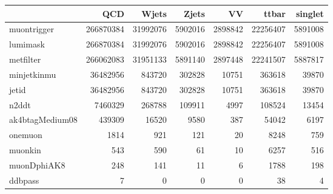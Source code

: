 \begin{tabular}{lrrrrrr}
\toprule
 & QCD & Wjets & Zjets & VV & ttbar & singlet \\
\midrule
muontrigger & 266870384 & 31992076 & 5902016 & 2898842 & 22256407 & 5891008 \\
lumimask & 266870384 & 31992076 & 5902016 & 2898842 & 22256407 & 5891008 \\
metfilter & 266062083 & 31951133 & 5891140 & 2897448 & 22241507 & 5887817 \\
minjetkinmu & 36482956 & 843720 & 302828 & 10751 & 363618 & 39870 \\
jetid & 36482956 & 843720 & 302828 & 10751 & 363618 & 39870 \\
n2ddt & 7460329 & 268788 & 109911 & 4997 & 108524 & 13454 \\
ak4btagMedium08 & 439309 & 16520 & 9580 & 387 & 54042 & 6197 \\
onemuon & 1814 & 921 & 121 & 20 & 8248 & 759 \\
muonkin & 543 & 590 & 61 & 10 & 6257 & 516 \\
muonDphiAK8 & 248 & 141 & 11 & 6 & 1788 & 198 \\
ddbpass & 7 & 0 & 0 & 0 & 38 & 4 \\
\bottomrule
\end{tabular}
